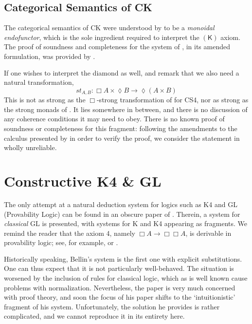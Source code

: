 \documentclass[a4paper]{amsart}
\begin{document}
\subsection{Categorical Semantics of \textsf{CK}}

The categorical semantics of \textsf{CK} were understood by
\cite{Bellin2001} to be a \emph{monoidal endofunctor}, which is
the sole ingredient required to interpret the $(\textsf{K})$
axiom. The proof of soundness and completeness for the system of
\cite{Bellin2001}, in its amended formulation, was provided by
\cite{Kakutani2007a}.

If one wishes to interpret the diamond as well, \cite{Bellin2001}
and \cite{dePaiva2011} remark that we also need a natural
transformation, \[
  st_{A, B} : \Box A \times \lozenge B \rightarrow \lozenge (A
  \times B)
\] This is not as strong as the $\Box$-strong transformation
of \cite{Kobayashi1997} for \textsf{CS4}, nor as strong as the
strong monads of \cite{Moggi1991}. It lies somewhere in between,
and there is no discussion of any coherence conditions it may need
to obey. There is no known proof of soundness or completeness for
this fragment: following the amendments to the calculus presented
by \cite{Kakutani2007a} in order to verify the proof, we consider
the statement in \citep{Bellin2001} wholly unreliable.

\section{Constructive \textsf{K4} \& \textsf{GL}}
  \label{sec:ck4gl}

The only attempt at a natural deduction system for logics such as
\textsf{K4} and \textsf{GL} (Provability Logic) can be found in an
obscure paper of \cite{Bellin1985}. Therein, a system for
\emph{classical} \textsf{GL} is presented, with systems for
\textsf{K} and \textsf{K4} appearing as fragments. We remind the
reader that the axiom \textsf{4}, namely $\Box A \rightarrow \Box
\Box A$, is derivable in provability logic; see, for example,
\cite{Boolos1994} or \cite{Artemov2002}.

Historically speaking, Bellin's system is the first one with
explicit substitutions. One can thus expect that it is not
particularly well-behaved. The situation is worsened by the
inclusion of rules for classical logic, which as is well known
cause problems with normalization. Nevertheless, the paper is very
much concerned with proof theory, and soon the focus of his paper
shifts to the `intuitionistic' fragment of his system.
Unfortunately, the solution he provides is rather complicated, and
we cannot reproduce it in its entirety here.
\end{document}
